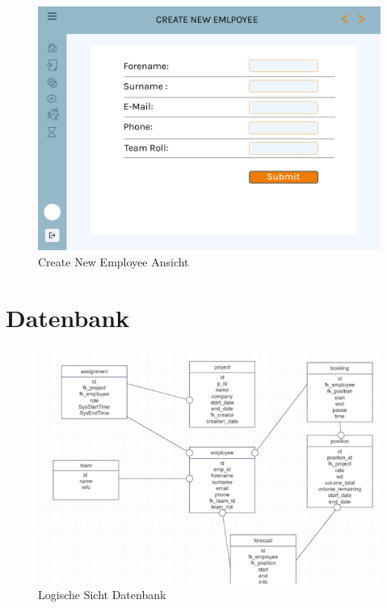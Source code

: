 \documentclass{article}
\begin{document}
\begin{figure}[h]
    \centering
    \includegraphics[width= \textwidth]{images/CreateNewEmployee.png}
    \caption{Create New Employee Ansicht}
    \label{fig:beispiel}
\end{figure}

\newpage
\clearpage

\section{Datenbank}

\begin{figure}[h]
    \centering
    \includegraphics[width= \textwidth]{images/logischeAnsicht.png}
    \caption{Logische Sicht Datenbank}
    \label{fig:beispiel}
\end{figure}
\end{document}
